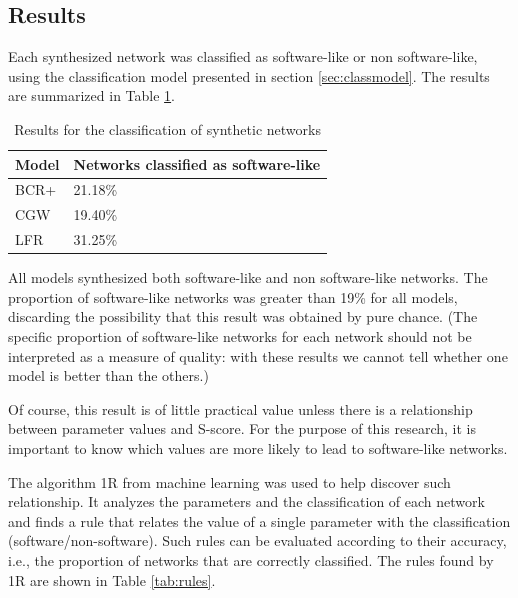 \subsection{Results}

Each synthesized network was classified as software-like or non software-like,
using the classification model presented in section \ref{sec:classmodel}. The
results are summarized in Table \ref{tab:results}. 

\begin{table}
\caption{Results for the classification of synthetic networks}
\centering
\begin{tabular}{|l|l|}
\hline
Model & Networks classified as software-like \\
\hline 
\hline
BCR+ & 21.18\% \\ %
\hline
CGW  & 19.40\% \\  %
\hline
LFR  & 31.25\% \\ %
\hline
\end{tabular}
\label{tab:results}
\end{table}

All models synthesized both software-like and non software-like networks. The
proportion of software-like networks was greater than 19\% for all models,
discarding the possibility that this result was obtained by pure chance. (The
specific proportion of software-like networks for each network should not be
interpreted as a measure of quality: with these results we cannot tell whether
one model is better than the others.)

Of course, this result is of little practical value unless there is a
relationship between parameter values and S-score. For the purpose of this
research, it is important to know which values are more likely to lead to
software-like networks.

The algorithm 1R \cite{OneR} from machine learning was used to help discover
such relationship. It analyzes the parameters and the classification of each
network and finds a rule that relates the value of a single parameter with the
classification (software/non-software). Such rules can be evaluated according
to their accuracy, i.e., the proportion of networks that are correctly
classified. The rules found by 1R are shown in Table \ref{tab:rules}.

